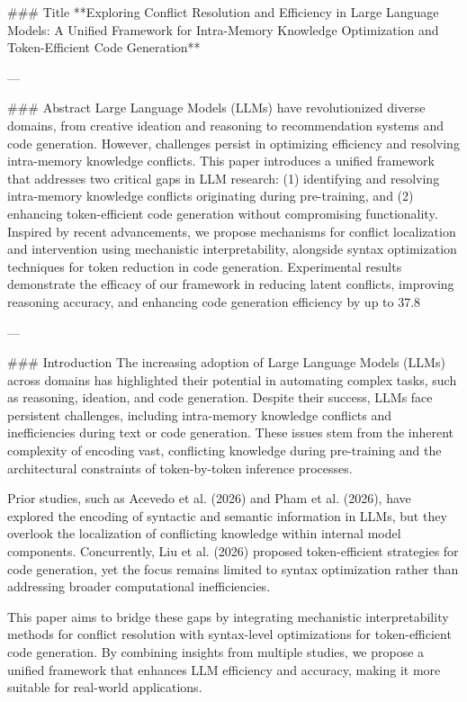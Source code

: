 ### Title  
**Exploring Conflict Resolution and Efficiency in Large Language Models: A Unified Framework for Intra-Memory Knowledge Optimization and Token-Efficient Code Generation**

---

### Abstract  
Large Language Models (LLMs) have revolutionized diverse domains, from creative ideation and reasoning to recommendation systems and code generation. However, challenges persist in optimizing efficiency and resolving intra-memory knowledge conflicts. This paper introduces a unified framework that addresses two critical gaps in LLM research: (1) identifying and resolving intra-memory knowledge conflicts originating during pre-training, and (2) enhancing token-efficient code generation without compromising functionality. Inspired by recent advancements, we propose mechanisms for conflict localization and intervention using mechanistic interpretability, alongside syntax optimization techniques for token reduction in code generation. Experimental results demonstrate the efficacy of our framework in reducing latent conflicts, improving reasoning accuracy, and enhancing code generation efficiency by up to 37.8%

---

### Introduction  
The increasing adoption of Large Language Models (LLMs) across domains has highlighted their potential in automating complex tasks, such as reasoning, ideation, and code generation. Despite their success, LLMs face persistent challenges, including intra-memory knowledge conflicts and inefficiencies during text or code generation. These issues stem from the inherent complexity of encoding vast, conflicting knowledge during pre-training and the architectural constraints of token-by-token inference processes.  

Prior studies, such as Acevedo et al. (2026) and Pham et al. (2026), have explored the encoding of syntactic and semantic information in LLMs, but they overlook the localization of conflicting knowledge within internal model components. Concurrently, Liu et al. (2026) proposed token-efficient strategies for code generation, yet the focus remains limited to syntax optimization rather than addressing broader computational inefficiencies.  

This paper aims to bridge these gaps by integrating mechanistic interpretability methods for conflict resolution with syntax-level optimizations for token-efficient code generation. By combining insights from multiple studies, we propose a unified framework that enhances LLM efficiency and accuracy, making it more suitable for real-world applications.

